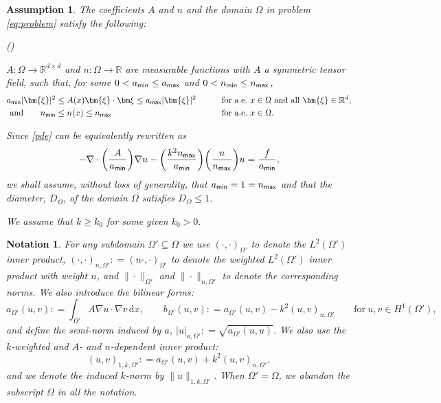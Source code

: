 \documentclass[numbers,webpdf,imaiai]{ima-authoring-template}%
\theoremstyle{thmstyletwo}%
\newtheorem{assumption}[theorem]{Assumption}%
\newtheorem{notation}[theorem]{Notation}
\numberwithin{equation}{section}
\newcommand{\assign}{\mathrel{\mathop:}=}
\numberwithin{equation}{section}
\newcommand{\rd}{\mathrm{d}}
\newcommand{\amin}{a_{\textup{\textsf{min}}}}
\newcommand{\amax}{a_{\textup{\textsf{max}}}}
\newcommand{\nmin}{n_{\textup{\textsf{min}}}}
\newcommand{\nmax}{n_{\textup{\textsf{max}}}}
\renewcommand{\kappa}{k}
\newcounter{counter_a}
\newenvironment{myenum}{\begin{list}{\textrm{\textup{(\roman{counter_a})}}\;}%
{\usecounter{counter_a}
\setlength{\itemsep}{0.5ex}\setlength{\topsep}{0.7ex}
\setlength{\leftmargin}{5ex}\setlength{\labelwidth}{6ex}}}{\end{list}}
\begin{document}
{\begin{assumption}\label{ass: 2_1}
	The coefficients $A$ and $n$ 
	and the domain $\Omega$ in problem \eqref{eq:problem} satisfy the following:
	\begin{myenum}
		\item
		$A: \Omega \rightarrow \mathbb{R}^{d \times d}$ and $n: \Omega \rightarrow \mathbb{R}$ are measurable functions 
		with $A$ a symmetric tensor field, such that, for some $0 < \amin \le \amax$ and $0 < \nmin \le \nmax$, 
		\begin{alignat*}{2}
			\amin|\bm{\xi}|^2 &\le A(x)\bm{\xi} \cdot {\bm \xi} \le \amax|\bm{\xi}|^2 
			\qquad && \text{for a.e.} \ x \in \Omega \text{ and all } \bm{\xi} \in \mathbb{R}^d, \\
			\text{and} \qquad \nmin &\le n(x) \le \nmax \qquad && \text{for a.e.} \ x \in \Omega.
		\end{alignat*}
                      
		\item
		Since \eqref{pde} can be equivalently rewritten as
		\[
			- \nabla \cdot \biggl(\frac{A}{\amin}\biggr) \nabla u -
			\biggl(\frac{k^2 \nmax}{\amin}\biggr)
			\biggl(\frac{n}{\nmax}\biggr) u
			= \frac{f}{\amin},
		\]              
		we shall assume, without loss of generality, that $\amin = 1 = \nmax$ and that the diameter, $D_\Omega$, 
		of the domain $\Omega$ satisfies $D_\Omega \le 1$. 
		\item
		We assume that $k\ge k_0$ for some given $k_0 > 0$.
	\end{myenum}
\end{assumption}

\begin{notation}
\label{not:forms}
For any subdomain $\Omega' \subseteq \Omega$ we use $(\cdot,\cdot)_{\Omega'}$ to denote the $L^2(\Omega')$ inner product, 
$(\cdot,\cdot)_{n,\Omega'}\assign(n\cdot,\cdot)_{\Omega'}$ to denote the weighted $L^2(\Omega')$ inner product with weight $n$,
and $\|\cdot\|_{\Omega'}$ and $\|\cdot\|_{n,\Omega'}$ to denote the corresponding norms.  We also introduce the bilinear forms:
\begin{equation}
	a_{\Omega'}(u,v) \assign \int_{\Omega'} A\nabla u \cdot \nabla v \,\rd x, \qquad
	b_{\Omega'}(u,v) \assign a_{\Omega'}(u,v) - k^2(u,v)_{{n},\Omega'}
	\qquad\text{for} \ u,v\in H^1(\Omega'),
    \label{eq:2.18}
\end{equation}
and define the semi-norm induced by $a$, $|u|_{a,\Omega'} \assign \sqrt{a_{\Omega'}(u,u)}$.
We also use the $\kappa$-weighted and $A$- and $n$-dependent inner product:
\begin{equation*}
    (u,v)_{1, \kappa,\Omega'} \assign a_{\Omega'}(u,v) + \kappa^2 (u,v)_{{n},\Omega'},
\end{equation*}
and we denote the induced $\kappa$-norm by $\|u\|_{1, \kappa, \Omega'}$.
When $\Omega'= \Omega$, we abandon the subscript $\Omega$ in all the notation.
\end{notation}

}
\end{document}
